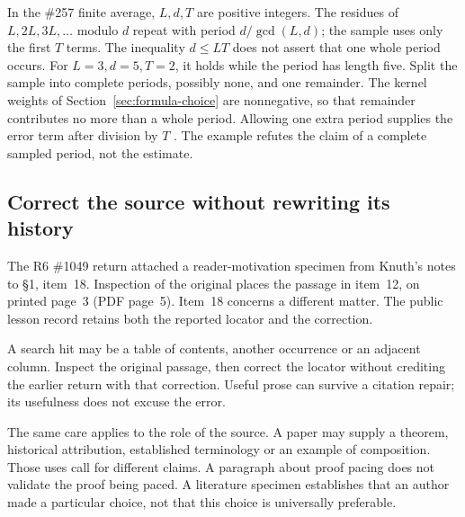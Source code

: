 In the \#257 finite average, $L,d,T$ are positive integers. The residues of
$L,2L,3L,\ldots$ modulo $d$ repeat with period $d/\gcd(L,d)$; the sample
uses only the first $T$ terms. The inequality $d\le LT$ does not assert
that one whole period occurs. For $L=3,d=5,T=2$, it holds while the period
has length five. Split the sample into complete periods, possibly none,
and one remainder. The kernel weights of Section~\ref{sec:formula-choice}
are nonnegative, so that remainder contributes no more than a whole period.
Allowing one extra period supplies the error term after division by $T$
\cite[finite means for shifted divisor tails]{paper257}.
The example refutes the claim of a complete sampled period, not the estimate.

\subsection{Correct the source without rewriting its history}

The R6 \#1049 return attached a reader-motivation specimen from Knuth's notes
to \S1, item~18. Inspection of the original places the passage in item~12,
on printed page~3 (PDF page~5). Item~18 concerns a different matter. The
public lesson record retains both the reported locator and the correction.

A search hit may be a table of contents, another occurrence or an adjacent
column. Inspect the original passage, then correct the locator without crediting
the earlier return with that correction. Useful prose can survive a citation
repair; its usefulness does not excuse the error.

The same care applies to the role of the source. A paper may supply a theorem,
historical attribution, established terminology or an example of composition.
Those uses call for different claims. A paragraph about proof pacing does not
validate the proof being paced. A literature specimen establishes that an
author made a particular choice, not that this choice is universally preferable.
